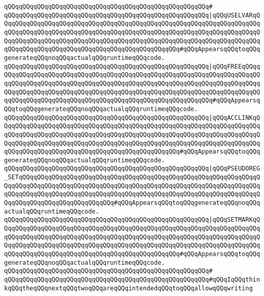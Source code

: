 \verb|qQQqqQQqqQQqqQQqqQQqqQQqqQQqqQQqqQQqqQQqqQQqqQQqqQQqqQQq#|\newline
\verb|qQQqqQQqqQQqqQQqqQQqqQQqqQQqqQQqqQQqqQQqqQQqqQQqqQQqqQQq|\verb#|qQQqUSELVARqQQqqQQqqQQqqQQqqQQqqQQqqQQqqQQqqQQqqQQqqQQqqQQqqQQqqQQqqQQqqQQqqQQqqQQqqQQqqQQqqQQqqQQqqQQqqQQqqQQqqQQqqQQqqQQqqQQqqQQqqQQqqQQqqQQqqQQqqQQqqQQqqQQqqQQqqQQqqQQqqQQqqQQqqQQqqQQqqQQqqQQqqQQqqQQqqQQqqQQqqQQqqQQqqQQqqQQqqQQqqQQqqQQqqQQqqQQqqQQqqQQqqQQqqQQqqQQqqQQq#\verb|#qQQqAppearsqQQqtoqQQqgenerateqQQqnoqQQqactualqQQqruntimeqQQqcode.|\newline
\verb|qQQqqQQqqQQqqQQqqQQqqQQqqQQqqQQqqQQqqQQqqQQqqQQqqQQqqQQq|\verb#|qQQqFREEqQQqqQQqqQQqqQQqqQQqqQQqqQQqqQQqqQQqqQQqqQQqqQQqqQQqqQQqqQQqqQQqqQQqqQQqqQQqqQQqqQQqqQQqqQQqqQQqqQQqqQQqqQQqqQQqqQQqqQQqqQQqqQQqqQQqqQQqqQQqqQQqqQQqqQQqqQQqqQQqqQQqqQQqqQQqqQQqqQQqqQQqqQQqqQQqqQQqqQQqqQQqqQQqqQQqqQQqqQQqqQQqqQQqqQQqqQQqqQQqqQQqqQQqqQQqqQQqqQQqqQQqqQQqqQQq#\verb|#qQQqAppearsqQQqtoqQQqgenerateqQQqnoqQQqactualqQQqruntimeqQQqcode.|\newline
\verb|qQQqqQQqqQQqqQQqqQQqqQQqqQQqqQQqqQQqqQQqqQQqqQQqqQQqqQQq|\verb#|qQQqACCLINKqQQqqQQqqQQqqQQqqQQqqQQqqQQqqQQqqQQqqQQqqQQqqQQqqQQqqQQqqQQqqQQqqQQqqQQqqQQqqQQqqQQqqQQqqQQqqQQqqQQqqQQqqQQqqQQqqQQqqQQqqQQqqQQqqQQqqQQqqQQqqQQqqQQqqQQqqQQqqQQqqQQqqQQqqQQqqQQqqQQqqQQqqQQqqQQqqQQqqQQqqQQqqQQqqQQqqQQqqQQqqQQqqQQqqQQqqQQqqQQqqQQqqQQqqQQqqQQqqQQq#\verb|#qQQqAppearsqQQqtoqQQqgenerateqQQqnoqQQqactualqQQqruntimeqQQqcode.|\newline
\verb|qQQqqQQqqQQqqQQqqQQqqQQqqQQqqQQqqQQqqQQqqQQqqQQqqQQqqQQq|\verb#|qQQqPSEUDOREG_SETqQQqqQQqqQQqqQQqqQQqqQQqqQQqqQQqqQQqqQQqqQQqqQQqqQQqqQQqqQQqqQQqqQQqqQQqqQQqqQQqqQQqqQQqqQQqqQQqqQQqqQQqqQQqqQQqqQQqqQQqqQQqqQQqqQQqqQQqqQQqqQQqqQQqqQQqqQQqqQQqqQQqqQQqqQQqqQQqqQQqqQQqqQQqqQQqqQQqqQQqqQQqqQQqqQQqqQQqqQQqqQQqqQQqqQQqqQQq#\verb|#qQQqAppearsqQQqtoqQQqgenerateqQQqnoqQQqactualqQQqruntimeqQQqcode.|\newline
\verb|qQQqqQQqqQQqqQQqqQQqqQQqqQQqqQQqqQQqqQQqqQQqqQQqqQQqqQQq|\verb#|qQQqSETMARKqQQqqQQqqQQqqQQqqQQqqQQqqQQqqQQqqQQqqQQqqQQqqQQqqQQqqQQqqQQqqQQqqQQqqQQqqQQqqQQqqQQqqQQqqQQqqQQqqQQqqQQqqQQqqQQqqQQqqQQqqQQqqQQqqQQqqQQqqQQqqQQqqQQqqQQqqQQqqQQqqQQqqQQqqQQqqQQqqQQqqQQqqQQqqQQqqQQqqQQqqQQqqQQqqQQqqQQqqQQqqQQqqQQqqQQqqQQqqQQqqQQqqQQqqQQqqQQqqQQq#\verb|#qQQqAppearsqQQqtoqQQqgenerateqQQqnoqQQqactualqQQqruntimeqQQqcode.|\newline
\verb|qQQqqQQqqQQqqQQqqQQqqQQqqQQqqQQqqQQqqQQqqQQqqQQqqQQqqQQq#|\newline
\verb|qQQqqQQqqQQqqQQqqQQqqQQqqQQqqQQqqQQqqQQqqQQqqQQqqQQqqQQq#qQQqIqQQqthinkqQQqtheqQQqnextqQQqtwoqQQqareqQQqintendedqQQqtoqQQqallowqQQqwriting|\newline
